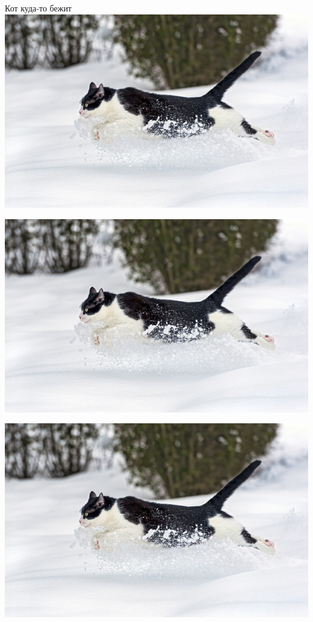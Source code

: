 \documentclass{article}
\begin{document}
Кот куда-то бежит \\
\includegraphics[scale=0.25]{cat.jpg} \\

{\centering
\includegraphics[scale=0.25]{cat.jpg}
\par} 

\begin{center}
\includegraphics[scale=0.25]{cat.jpg} \\
\end{center}
\end{document}
